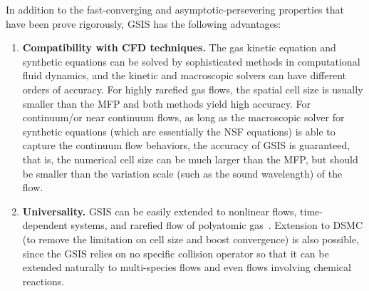 In addition to the fast-converging and asymptotic-persevering properties that have been prove rigorously,  GSIS has the following advantages:
\begin{enumerate}	
	
	
	\item \textbf{Compatibility with CFD techniques.} The gas kinetic equation and synthetic equations can be solved by sophisticated methods in computational fluid dynamics, and the kinetic and macroscopic solvers can have different orders of accuracy. For highly rarefied gas flows, the spatial cell size is usually smaller than the MFP and both methods yield high accuracy. For continuum/or near continuum flows, as long as the macroscopic solver for synthetic equations (which are essentially the NSF equations) is able to capture the continuum flow behaviors, the accuracy of GSIS is guaranteed, that is, the numerical cell size can be much larger than the MFP, but should be smaller than the variation scale (such as the sound wavelength) of the flow. %
	
	\item  \textbf{Universality.}  GSIS can be easily extended to nonlinear flows, time-dependent systems, and rarefied flow of polyatomic gas~\cite{Zhu2021JCP,Su2021CMAME}. Extension to DSMC (to remove the limitation on cell size and boost convergence) is also possible, since the GSIS relies on no specific collision operator so that it can be extended naturally to multi-species flows and even flows involving chemical reactions. 
	

\end{enumerate}
